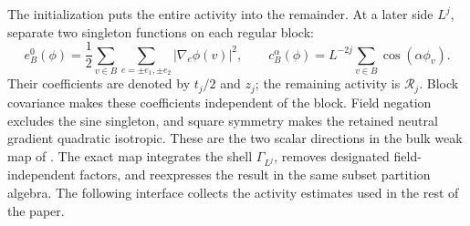 The initialization puts the entire activity into the remainder.  At a
later side $L^j$, separate two singleton functions on each regular block:
\[
 e_B^0(\phi)=\frac12\sum_{v\in B}\sum_{e=\pm e_1,\pm e_2}
                                      |\nabla_e\phi(v)|^2,
 \qquad
 c_B^\alpha(\phi)=L^{-2j}\sum_{v\in B}\cos(\alpha\phi_v).
\]
Their coefficients are denoted by $t_j/2$ and $z_j$; the remaining
activity is $\mathcal R_j$.  Block covariance makes these coefficients
independent of the block.  Field negation excludes the sine singleton,
and square symmetry makes the retained neutral gradient quadratic
isotropic.  These are the two scalar directions in the bulk weak map
of \cite[Section~5.1]{F}.  The exact map integrates the shell
$\Gamma_{L^j}$, removes designated field-independent factors, and
reexpresses the result in the same subset partition algebra.  The
following interface collects the activity estimates used in the rest
of the paper.

